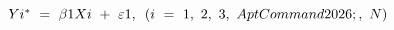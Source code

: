 $Y{{i}^{\rm{*}}}{\rm{\ }} = {\rm{\ }}\beta 1Xi{\rm{\ }} + {\rm{\ }}\varepsilon 1,{\rm{\ }}\left( {i{\rm{\ }} = {\rm{\ }}1,{\rm{\ }}2,{\rm{\ }}3,{\rm{\ }}AptCommand2026;,{\rm{\ }}N} \right)$

